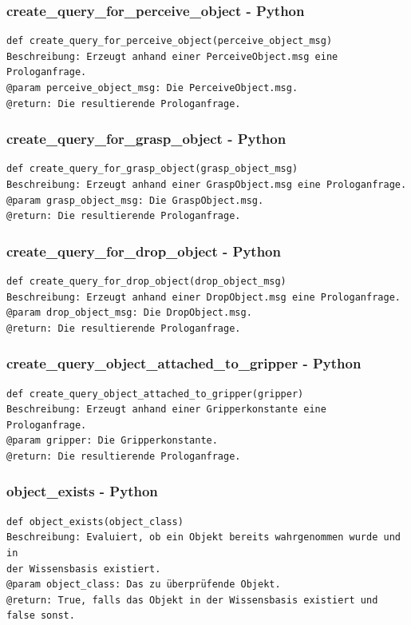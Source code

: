 \documentclass{suturo}
\begin{document}
\subsubsection{create\_query\_for\_perceive\_object - Python}
\begin{verbatim}
def create_query_for_perceive_object(perceive_object_msg)
Beschreibung: Erzeugt anhand einer PerceiveObject.msg eine Prologanfrage.
@param perceive_object_msg: Die PerceiveObject.msg.
@return: Die resultierende Prologanfrage.
\end{verbatim}

\subsubsection{create\_query\_for\_grasp\_object - Python}
\begin{verbatim}
def create_query_for_grasp_object(grasp_object_msg)
Beschreibung: Erzeugt anhand einer GraspObject.msg eine Prologanfrage.
@param grasp_object_msg: Die GraspObject.msg.
@return: Die resultierende Prologanfrage.
\end{verbatim}

\subsubsection{create\_query\_for\_drop\_object - Python}
\begin{verbatim}
def create_query_for_drop_object(drop_object_msg)
Beschreibung: Erzeugt anhand einer DropObject.msg eine Prologanfrage.
@param drop_object_msg: Die DropObject.msg.
@return: Die resultierende Prologanfrage.
\end{verbatim}

\subsubsection{create\_query\_object\_attached\_to\_gripper - Python}
\begin{verbatim}
def create_query_object_attached_to_gripper(gripper)
Beschreibung: Erzeugt anhand einer Gripperkonstante eine Prologanfrage.
@param gripper: Die Gripperkonstante.
@return: Die resultierende Prologanfrage.
\end{verbatim}

\subsubsection{object\_exists - Python}
\begin{verbatim}
def object_exists(object_class)
Beschreibung: Evaluiert, ob ein Objekt bereits wahrgenommen wurde und in 
der Wissensbasis existiert.
@param object_class: Das zu überprüfende Objekt.
@return: True, falls das Objekt in der Wissensbasis existiert und false sonst.
\end{verbatim}
\end{document}
